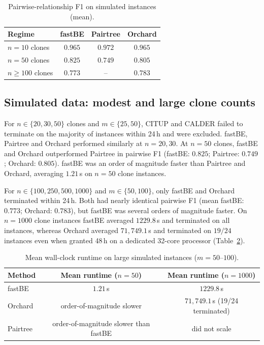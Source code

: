 \documentclass[11pt]{article}
\begin{document}
\begin{table}[h]
\centering
\caption{Pairwise-relationship F1 on simulated instances (mean).}
\label{tab:small}
\begin{tabular}{lccc}
\toprule
Regime & fastBE & Pairtree & Orchard \\
\midrule
$n=10$ clones & $0.965$ & $0.972$ & $0.965$ \\
$n=50$ clones & $0.825$ & $0.749$ & $0.805$ \\
$n \ge 100$ clones & $0.773$ & -- & $0.783$ \\
\bottomrule
\end{tabular}
\end{table}

\subsection{Simulated data: modest and large clone counts}
For $n \in \{20,30,50\}$ clones and $m \in \{25,50\}$, CITUP and CALDER failed to terminate on the majority of instances within 24\,h and were excluded. fastBE, Pairtree and Orchard performed similarly at $n = 20,30$. At $n = 50$ clones, fastBE and Orchard outperformed Pairtree in pairwise F1 (fastBE: $0.825$; Pairtree: $0.749$; Orchard: $0.805$). fastBE was an order of magnitude faster than Pairtree and Orchard, averaging $1.21$\,s on $n = 50$ clone instances.

For $n \in \{100,250,500,1000\}$ and $m \in \{50,100\}$, only fastBE and Orchard terminated within 24\,h. Both had nearly identical pairwise F1 (mean fastBE: $0.773$; Orchard: $0.783$), but fastBE was several orders of magnitude faster. On $n = 1000$ clone instances fastBE averaged $1229.8$\,s and terminated on all instances, whereas Orchard averaged $71{,}749.1$\,s and terminated on $19/24$ instances even when granted 48\,h on a dedicated 32-core processor (Table~\ref{tab:runtime}).

\begin{table}[h]
\centering
\caption{Mean wall-clock runtime on large simulated instances ($m = 50$--$100$).}
\label{tab:runtime}
\begin{tabular}{lcc}
\toprule
Method & Mean runtime ($n=50$) & Mean runtime ($n=1000$) \\
\midrule
fastBE & $1.21$\,s & $1229.8$\,s \\
Orchard & order-of-magnitude slower & $71{,}749.1$\,s (19/24 terminated) \\
Pairtree & order-of-magnitude slower than fastBE & did not scale \\
\bottomrule
\end{tabular}
\end{table}
\end{document}
